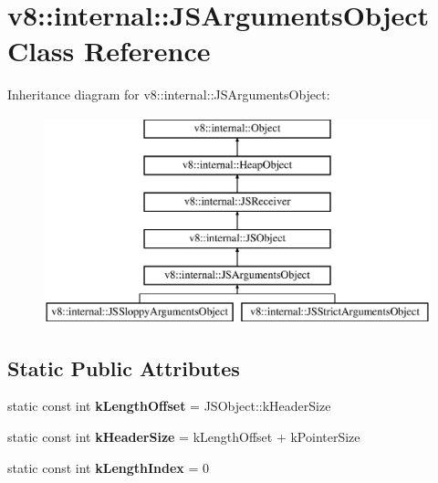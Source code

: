 \hypertarget{classv8_1_1internal_1_1_j_s_arguments_object}{}\section{v8\+:\+:internal\+:\+:J\+S\+Arguments\+Object Class Reference}
\label{classv8_1_1internal_1_1_j_s_arguments_object}
Inheritance diagram for v8\+:\+:internal\+:\+:J\+S\+Arguments\+Object\+:\begin{figure}[H]
\begin{center}
\leavevmode
\includegraphics[height=6.000000cm]{classv8_1_1internal_1_1_j_s_arguments_object}
\end{center}
\end{figure}
\subsection*{Static Public Attributes}
\begin{DoxyCompactItemize}
\item 
static const int {\bfseries k\+Length\+Offset} = J\+S\+Object\+::k\+Header\+Size\hypertarget{classv8_1_1internal_1_1_j_s_arguments_object_a73a4af6208777d6d1208d041e518bd11}{}\label{classv8_1_1internal_1_1_j_s_arguments_object_a73a4af6208777d6d1208d041e518bd11}

\item 
static const int {\bfseries k\+Header\+Size} = k\+Length\+Offset + k\+Pointer\+Size\hypertarget{classv8_1_1internal_1_1_j_s_arguments_object_a6d6cf9363bd780b7de1a99a5115a6e64}{}\label{classv8_1_1internal_1_1_j_s_arguments_object_a6d6cf9363bd780b7de1a99a5115a6e64}

\item 
static const int {\bfseries k\+Length\+Index} = 0\hypertarget{classv8_1_1internal_1_1_j_s_arguments_object_ac71caf732437f91438992b21d8fc333a}{}\label{classv8_1_1internal_1_1_j_s_arguments_object_ac71caf732437f91438992b21d8fc333a}

\end{DoxyCompactItemize}
